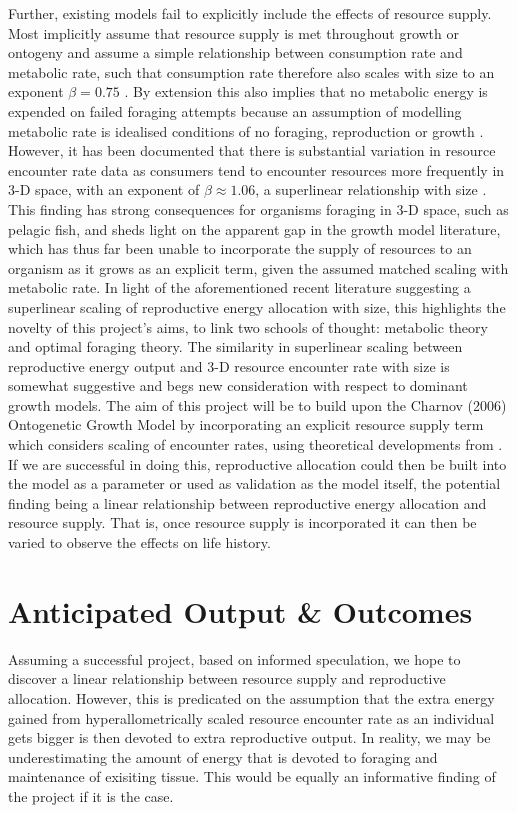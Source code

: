 \documentclass[11pt]{article}
\begin{document}
        Further, existing models fail to explicitly include the effects of resource supply. Most implicitly assume that resource supply is met throughout growth or ontogeny and assume a simple relationship between consumption rate and metabolic rate, such that consumption rate therefore also scales with size to an exponent $\beta = 0.75$ . By extension this also implies that no metabolic energy is expended on failed foraging attempts because an assumption of modelling metabolic rate is idealised conditions of no foraging, reproduction or growth . However, it has been documented that there is substantial variation in resource encounter rate data as consumers tend to encounter resources more frequently in 3-D space, with an exponent of $\beta \approx 1.06$, a superlinear relationship with size . This finding has strong consequences for organisms foraging in 3-D space, such as pelagic fish, and sheds light on the apparent gap in the growth model literature, which has thus far been unable to incorporate the supply of resources to an organism as it grows as an explicit term, given the assumed matched scaling with metabolic rate. In light of the aforementioned recent literature suggesting a superlinear scaling of reproductive energy allocation with size, this highlights the novelty of this project's aims, to link two schools of thought: metabolic theory and optimal foraging theory. The similarity in superlinear scaling between reproductive energy output and 3-D resource encounter rate with size is somewhat suggestive and begs new consideration with respect to dominant growth models. The aim of this project will be to build upon the Charnov (2006) Ontogenetic Growth Model by incorporating an explicit resource supply term which considers scaling of encounter rates, using theoretical developments from . If we are successful in doing this, reproductive allocation could then be built into the model as a parameter or used as validation as the model itself, the potential finding being a linear relationship between reproductive energy allocation and resource supply. That is, once resource supply is incorporated it can then be varied to observe the effects on life history.  \color{black} %


    \section{Anticipated Output \& Outcomes}
        Assuming a successful project, based on informed speculation, we hope to discover a linear relationship between resource supply and reproductive allocation. However, this is predicated on the assumption that the extra energy gained from hyperallometrically scaled resource encounter rate as an individual gets bigger is then devoted to extra reproductive output. In reality, we may be underestimating the amount of energy that is devoted to foraging and maintenance of exisiting tissue. This would be equally an informative finding of the project if it is the case.
\end{document}

